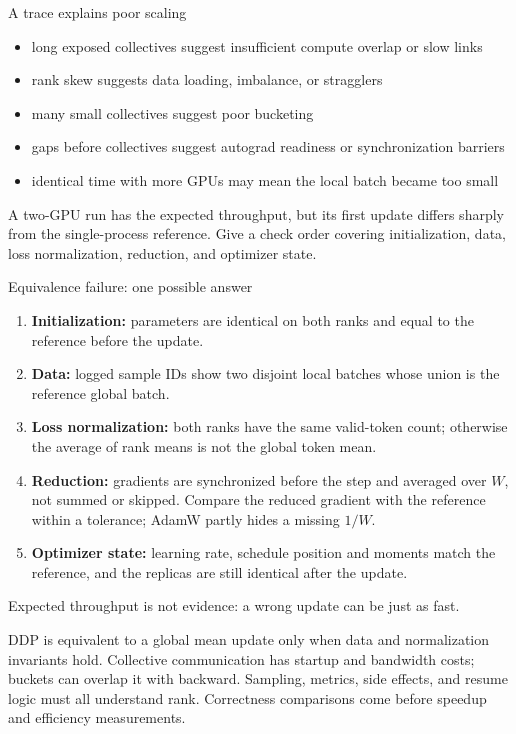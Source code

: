 \documentclass[handout]{beamer}
\begin{document}
\begin{frame}{A trace explains poor scaling}
  \begin{itemize}
      \setlength{\itemsep}{7pt}
    \item long exposed collectives suggest insufficient compute overlap or slow links
    \item rank skew suggests data loading, imbalance, or stragglers
    \item many small collectives suggest poor bucketing
    \item gaps before collectives suggest autograd readiness or synchronization barriers
    \item identical time with more GPUs may mean the local batch became too small
  \end{itemize}
\end{frame}

{A two-GPU run has the expected throughput, but its first update differs sharply from the single-process reference. Give a check order covering initialization, data, loss normalization, reduction, and optimizer state.}

\begin{frame}{Equivalence failure: one possible answer}
  \small
  \begin{enumerate}
      \setlength{\itemsep}{7pt}
    \item \textbf{Initialization:} parameters are identical on both ranks and equal to the reference before the update.
    \item \textbf{Data:} logged sample IDs show two disjoint local batches whose union is the reference global batch.
    \item \textbf{Loss normalization:} both ranks have the same valid-token count; otherwise the average of rank means is not the global token mean.
    \item \textbf{Reduction:} gradients are synchronized before the step and averaged over $W$, not summed or skipped. Compare the reduced gradient with the reference within a tolerance; AdamW partly hides a missing $1/W$.
    \item \textbf{Optimizer state:} learning rate, schedule position and moments match the reference, and the replicas are still identical after the update.
  \end{enumerate}
  \vfill
  Expected throughput is not evidence: a wrong update can be just as fast.
\end{frame}

\takeaways
{DDP is equivalent to a global mean update only when data and normalization invariants hold.}
{Collective communication has startup and bandwidth costs; buckets can overlap it with backward.}
{Sampling, metrics, side effects, and resume logic must all understand rank.}
{Correctness comparisons come before speedup and efficiency measurements.}
\end{document}
